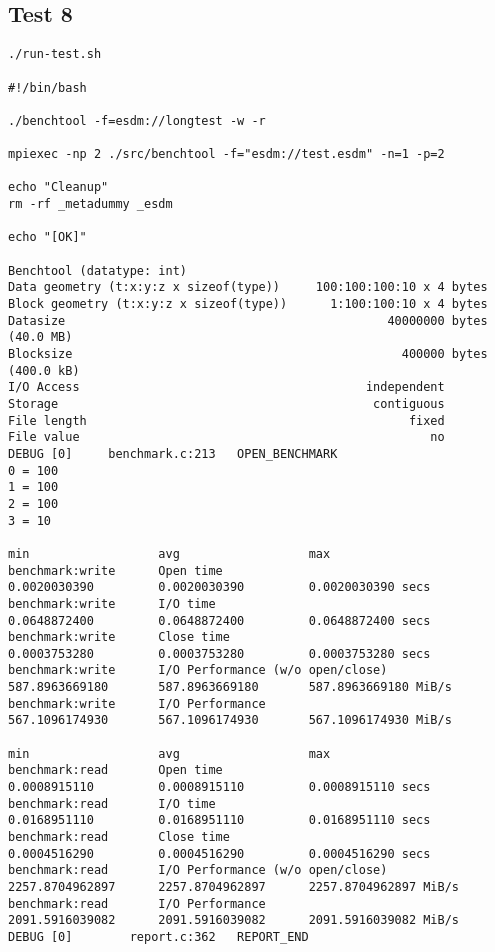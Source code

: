 \subsection{Test 8}

\begin{verbatim}
./run-test.sh

#!/bin/bash

./benchtool -f=esdm://longtest -w -r

mpiexec -np 2 ./src/benchtool -f="esdm://test.esdm" -n=1 -p=2

echo "Cleanup"
rm -rf _metadummy _esdm

echo "[OK]"

Benchtool (datatype: int)
Data geometry (t:x:y:z x sizeof(type))     100:100:100:10 x 4 bytes
Block geometry (t:x:y:z x sizeof(type))      1:100:100:10 x 4 bytes
Datasize                                             40000000 bytes                (40.0 MB)
Blocksize                                              400000 bytes                (400.0 kB)
I/O Access                                        independent
Storage                                            contiguous
File length                                             fixed
File value                                                 no
DEBUG [0]     benchmark.c:213   OPEN_BENCHMARK
0 = 100
1 = 100
2 = 100
3 = 10
                                                                               min                  avg                  max
benchmark:write      Open time                                        0.0020030390         0.0020030390         0.0020030390 secs
benchmark:write      I/O time                                         0.0648872400         0.0648872400         0.0648872400 secs
benchmark:write      Close time                                       0.0003753280         0.0003753280         0.0003753280 secs
benchmark:write      I/O Performance (w/o open/close)               587.8963669180       587.8963669180       587.8963669180 MiB/s
benchmark:write      I/O Performance                                567.1096174930       567.1096174930       567.1096174930 MiB/s
                                                                               min                  avg                  max
benchmark:read       Open time                                        0.0008915110         0.0008915110         0.0008915110 secs
benchmark:read       I/O time                                         0.0168951110         0.0168951110         0.0168951110 secs
benchmark:read       Close time                                       0.0004516290         0.0004516290         0.0004516290 secs
benchmark:read       I/O Performance (w/o open/close)              2257.8704962897      2257.8704962897      2257.8704962897 MiB/s
benchmark:read       I/O Performance                               2091.5916039082      2091.5916039082      2091.5916039082 MiB/s
DEBUG [0]        report.c:362   REPORT_END


\end{verbatim}
